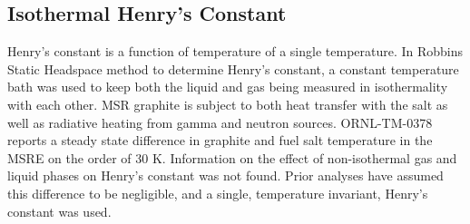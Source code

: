 \subsection{Isothermal Henry's Constant}
Henry's constant is a function of temperature of a single temperature.  In Robbins Static Headspace method to determine Henry's constant, a constant temperature bath was used to keep both the liquid and gas being measured in isothermality with each other.  \cite{Robbins1993}  MSR graphite is subject to both heat transfer with the salt as well as radiative heating from gamma and neutron sources. ORNL-TM-0378 reports a steady state difference in graphite and fuel salt temperature in the MSRE on the order of 30 K. \cite[P. 42]{ORNLTM378}  Information on the effect of non-isothermal gas and liquid phases on Henry's constant was not found.  Prior analyses have assumed this difference to be negligible, and a single, temperature invariant, Henry's constant was used.